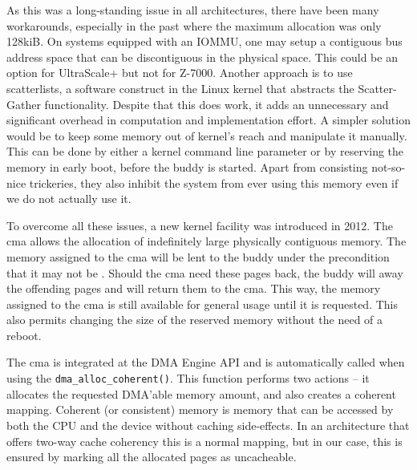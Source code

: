 As this was a long-standing issue in all architectures, there have been many workarounds, especially
in the past where the maximum allocation was only 128kiB. On systems equipped with an IOMMU,
one may setup a contiguous bus address space that can be discontiguous in the physical space.
This could be an option for UltraScale+ but not for Z-7000. Another approach is to use
\glspl{scatterlist}, a software construct in the Linux kernel that abstracts the Scatter-Gather functionality.
Despite that this does work, it adds an unnecessary and significant overhead in computation and implementation effort.
A simpler solution would be to keep some memory out of kernel's reach and manipulate it manually.
This can be done by either a kernel command line parameter or by reserving the memory in early
boot, before the \gls{buddy} is started.
Apart from consisting not-so-nice trickeries, they also inhibit the system from ever using this memory
even if we do not actually use it.

To overcome all these issues, a new kernel facility was introduced in 2012. The \gls{cma}
allows the allocation of indefinitely large physically contiguous memory.
The memory assigned to the \gls{cma} will be lent to the \gls{buddy} under the precondition
that it may not be . Should the \gls{cma} need
these pages back, the \gls{buddy} will  away the offending pages 
and will return them to the \gls{cma}. This way, the memory assigned to the \gls{cma} is
still available for general usage until it is requested. This also permits changing the
size of the reserved memory without the need of a reboot.

The \gls{cma} is integrated at the DMA Engine API and is automatically called when using
the \texttt{dma\_alloc\_coherent()}. This function performs two actions -- it allocates
the requested DMA'able memory amount, and also creates a coherent mapping. Coherent
(or consistent) memory is memory that can be accessed by both the CPU and the device
without caching side-effects. In an architecture that offers two-way cache coherency
this is a normal mapping, but in our case, this is ensured by marking all the allocated
pages as uncacheable.
\\

